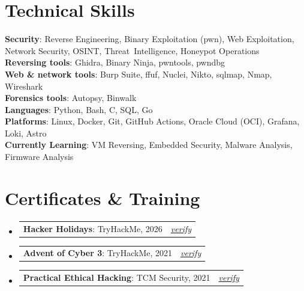 \documentclass[letterpaper,11pt]{article}
\makeatletter
\newcommand{\resumeEntry}[2]{%
  \item
  \begin{tabular*}{\linewidth}{@{}l@{\extracolsep{\fill}}r@{}}
    #1 & \textit{\small #2} \\
  \end{tabular*}\vspace{-6pt}%
}
\newcommand{\resumeSubHeadingListStart}{\begin{itemize}[leftmargin=0.15in, label={}]}
\newcommand{\resumeSubHeadingListEnd}{\end{itemize}}
\makeatother
\begin{document}
\section{Technical Skills}
 \begin{itemize}[leftmargin=0.15in, label={}]
    \small{\item{
     \textbf{Security}{: Reverse Engineering, Binary Exploitation (pwn), Web Exploitation, Network Security, OSINT, Threat~Intelligence, Honeypot Operations} \\
     \textbf{Reversing tools}{: Ghidra, Binary Ninja, pwntools, pwndbg} \\
     \textbf{Web \& network tools}{: Burp Suite, ffuf, Nuclei, Nikto, sqlmap, Nmap, Wireshark} \\
     \textbf{Forensics tools}{: Autopsy, Binwalk} \\
     \textbf{Languages}{: Python, Bash, C, SQL, Go} \\
     \textbf{Platforms}{: Linux, Docker, Git, GitHub Actions, Oracle Cloud (OCI), Grafana, Loki, Astro} \\
     \textbf{Currently Learning}{: VM Reversing, Embedded Security, Malware Analysis, Firmware Analysis}
    }}
 \end{itemize}


\section{Certificates \& Training}
  \resumeSubHeadingListStart
    \resumeEntry{\textbf{Hacker Holidays}: TryHackMe, 2026}{\href{https://tryhackme-certificates.s3-eu-west-1.amazonaws.com/THM-THCFDTXKFZ.pdf}{verify}}
    \resumeEntry{\textbf{Advent of Cyber 3}: TryHackMe, 2021}{\href{https://tryhackme-certificates.s3-eu-west-1.amazonaws.com/THM-KMESEDNQTS.pdf}{verify}}
    \resumeEntry{\textbf{Practical Ethical Hacking}: TCM Security, 2021}{\href{https://www.udemy.com/certificate/UC-17b88a43-ad89-4b6a-a73a-ce3f22cdc753/}{verify}}
  \resumeSubHeadingListEnd
\end{document}
